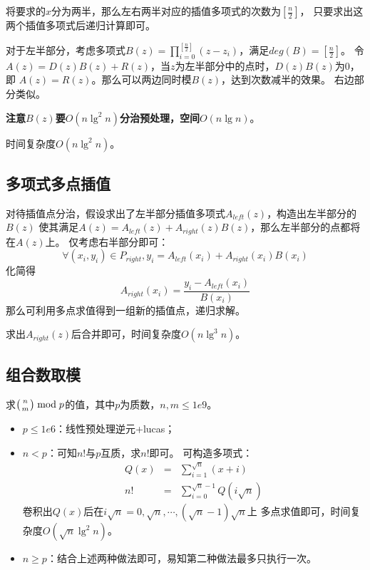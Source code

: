 将要求的$x$分为两半，那么左右两半对应的插值多项式的次数为$[\frac{n}{2}]$，
只要求出这两个插值多项式后递归计算即可。

对于左半部分，考虑多项式$\displaystyle B(z)=\prod_{i=0}^
{[\frac{n}{2}]}(z-z_i)$，满足$deg(B)=[\frac{n}{2}]$。
令$A(z)=D(z)B(z)+R(z)$，当$z$为左半部分中的点时，$D(z)B(z)$为0，即
$A(z)=R(z)$。那么可以两边同时模$B(z)$，达到次数减半的效果。
右边部分类似。

{\bfseries 注意$B(z)$要$O(n\lg^2 n)$分治预处理，空间$O(n\lg n)$}。

时间复杂度$O(n\lg^2n)$。
\subsection{多项式多点插值}

对待插值点分治，假设求出了左半部分插值多项式$A_{left}(z)$，构造出左半部分的$B(z)$
使其满足$A(z)=A_{left}(z)+A_{right}(z)B(z)$，那么左半部分的点都将在$A(z)$上。
仅考虑右半部分即可：
\begin{displaymath}
    \forall(x_i,y_i)\in P_{right},y_i=A_{left}(x_i)+A_{right}(x_i)B(x_i)
\end{displaymath}
化简得
\begin{displaymath}
    A_{right}(x_i)=\frac{y_i-A_{left}(x_i)}{B(x_i)}
\end{displaymath}
那么可利用多点求值得到一组新的插值点，递归求解。

求出$A_{right}(z)$后合并即可，时间复杂度$O(n \lg^3 n)$。
\subsection{组合数取模}

求$\left(n \atop m\right) \bmod{p}$的值，其中$p$为质数，$n,m\leq 1e9$。

\begin{itemize}
    \item $p\leq 1e6$：线性预处理逆元+lucas；
    \item $n<p$：可知$n!$与$p$互质，求$n!$即可。
    可构造多项式：
    \begin{eqnarray*}
        Q(x)&=&\sum_{i=1}^{\sqrt{n}}{(x+i)}\\
        n!&=&\sum_{i=0}^{\sqrt{n}-1}{Q(i\sqrt{n})}
    \end{eqnarray*}
    卷积出$Q(x)$后在$i\sqrt{n}=0,\sqrt{n},\cdots,(\sqrt{n}-1)\sqrt{n}$上
    多点求值即可，时间复杂度$O(\sqrt{n}\lg^2 n)$。
    \item $n\geq p$：结合上述两种做法即可，易知第二种做法最多只执行一次。
\end{itemize}

